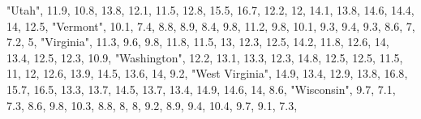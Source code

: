 \documentclass[
]{book}
\newenvironment{Shaded}{\begin{snugshade}}{\end{snugshade}}
\newcommand{\DecValTok}[1]{\textcolor[rgb]{0.00,0.00,0.81}{#1}}
\newcommand{\FloatTok}[1]{\textcolor[rgb]{0.00,0.00,0.81}{#1}}
\newcommand{\NormalTok}[1]{#1}
\newcommand{\StringTok}[1]{\textcolor[rgb]{0.31,0.60,0.02}{#1}}
\begin{document}
\begin{Shaded}
\begin{Highlighting}[]
                  \StringTok{"Utah"}\NormalTok{, }\FloatTok{11.9}\NormalTok{, }\FloatTok{10.8}\NormalTok{, }\FloatTok{13.8}\NormalTok{, }\FloatTok{12.1}\NormalTok{, }\FloatTok{11.5}\NormalTok{, }\FloatTok{12.8}\NormalTok{, }\FloatTok{15.5}\NormalTok{, }\FloatTok{16.7}\NormalTok{, }\FloatTok{12.2}\NormalTok{,   }\DecValTok{12}\NormalTok{, }\FloatTok{14.1}\NormalTok{, }\FloatTok{13.8}\NormalTok{, }\FloatTok{14.6}\NormalTok{, }\FloatTok{14.4}\NormalTok{,   }\DecValTok{14}\NormalTok{, }\FloatTok{12.5}\NormalTok{,}
               \StringTok{"Vermont"}\NormalTok{, }\FloatTok{10.1}\NormalTok{,  }\FloatTok{7.4}\NormalTok{,  }\FloatTok{8.8}\NormalTok{,  }\FloatTok{8.9}\NormalTok{,  }\FloatTok{8.4}\NormalTok{,  }\FloatTok{9.8}\NormalTok{, }\FloatTok{11.2}\NormalTok{,  }\FloatTok{9.8}\NormalTok{, }\FloatTok{10.1}\NormalTok{,  }\FloatTok{9.3}\NormalTok{,  }\FloatTok{9.4}\NormalTok{,  }\FloatTok{9.3}\NormalTok{,  }\FloatTok{8.6}\NormalTok{,    }\DecValTok{7}\NormalTok{,  }\FloatTok{7.2}\NormalTok{,    }\DecValTok{5}\NormalTok{,}
              \StringTok{"Virginia"}\NormalTok{, }\FloatTok{11.3}\NormalTok{,  }\FloatTok{9.6}\NormalTok{,  }\FloatTok{9.8}\NormalTok{, }\FloatTok{11.8}\NormalTok{, }\FloatTok{11.5}\NormalTok{,   }\DecValTok{13}\NormalTok{, }\FloatTok{12.3}\NormalTok{, }\FloatTok{12.5}\NormalTok{, }\FloatTok{14.2}\NormalTok{, }\FloatTok{11.8}\NormalTok{, }\FloatTok{12.6}\NormalTok{,   }\DecValTok{14}\NormalTok{, }\FloatTok{13.4}\NormalTok{, }\FloatTok{12.5}\NormalTok{, }\FloatTok{12.3}\NormalTok{, }\FloatTok{10.9}\NormalTok{,}
            \StringTok{"Washington"}\NormalTok{, }\FloatTok{12.2}\NormalTok{, }\FloatTok{13.1}\NormalTok{, }\FloatTok{13.3}\NormalTok{, }\FloatTok{12.3}\NormalTok{, }\FloatTok{14.8}\NormalTok{, }\FloatTok{12.5}\NormalTok{, }\FloatTok{12.5}\NormalTok{, }\FloatTok{11.5}\NormalTok{,   }\DecValTok{11}\NormalTok{,   }\DecValTok{12}\NormalTok{, }\FloatTok{12.6}\NormalTok{, }\FloatTok{13.9}\NormalTok{, }\FloatTok{14.5}\NormalTok{, }\FloatTok{13.6}\NormalTok{,   }\DecValTok{14}\NormalTok{,  }\FloatTok{9.2}\NormalTok{,}
         \StringTok{"West Virginia"}\NormalTok{, }\FloatTok{14.9}\NormalTok{, }\FloatTok{13.4}\NormalTok{, }\FloatTok{12.9}\NormalTok{, }\FloatTok{13.8}\NormalTok{, }\FloatTok{16.8}\NormalTok{, }\FloatTok{15.7}\NormalTok{, }\FloatTok{16.5}\NormalTok{, }\FloatTok{13.3}\NormalTok{, }\FloatTok{13.7}\NormalTok{, }\FloatTok{14.5}\NormalTok{, }\FloatTok{13.7}\NormalTok{, }\FloatTok{13.4}\NormalTok{, }\FloatTok{14.9}\NormalTok{, }\FloatTok{14.6}\NormalTok{,   }\DecValTok{14}\NormalTok{,  }\FloatTok{8.6}\NormalTok{,}
             \StringTok{"Wisconsin"}\NormalTok{,  }\FloatTok{9.7}\NormalTok{,  }\FloatTok{7.1}\NormalTok{,  }\FloatTok{7.3}\NormalTok{,  }\FloatTok{8.6}\NormalTok{,  }\FloatTok{9.8}\NormalTok{, }\FloatTok{10.3}\NormalTok{,  }\FloatTok{8.8}\NormalTok{,    }\DecValTok{8}\NormalTok{,    }\DecValTok{8}\NormalTok{,  }\FloatTok{9.2}\NormalTok{,  }\FloatTok{8.9}\NormalTok{,  }\FloatTok{9.4}\NormalTok{, }\FloatTok{10.4}\NormalTok{,  }\FloatTok{9.7}\NormalTok{,  }\FloatTok{9.1}\NormalTok{,  }\FloatTok{7.3}\NormalTok{,}

\end{Highlighting}
\end{Shaded}
\end{document}
